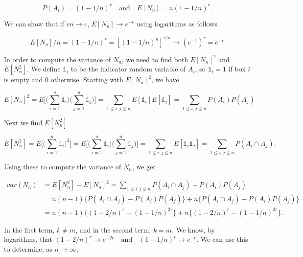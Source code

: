 \documentclass[11pt]{article}
\begin{document}
\begin{equation}
P(A_{i}) = (1 - 1/n)^{r} \quad \text{and} \quad E[N_{n}] = n(1 - 1/n)^{r}.
\end{equation}

\noindent We can show that if $rn \to c$, $E[N_{n}] \to e^{-c}$ using logarithms as follows

\begin{equation}
 E[N_{n}]/n = (1 - 1/n)^{r} = [(1 - 1/n)^{n}]^{r/n} \to (e^{-1})^{c} = e^{-c}
\end{equation}

In order to compute the variance of $N_{n}$, we need to find both $E[N_{n}]^{2}$ and $E[N_{n}^{2}]$. We define $\mathds{1}_{i}$ to be the indicator random variable of $A_{i}$, so $\mathds{1}_{i} = 1$ if box $i$ is empty and 0 otherwise. Starting with $E[N_{n}]^{2}$, we have

\begin{equation}
 E[N_{n}]^{2} = E\bigg[\bigg(\sum_{i=1}^{n}\mathds{1}_{i}\bigg)\bigg(\sum_{j=1}^{n}\mathds{1}_{j}\bigg)\bigg] = \sum_{1 \le i,j \le n}E[\mathds{1}_{i}]E[\mathds{1}_{j}] = \sum_{1 \le i,j \le n} P(A_{i})P(A_{j})
\end{equation}

\noindent Next we find $E[N_{n}^{2}]$

\begin{equation}
E[N_{n}^{2}] = E\bigg[\bigg(\sum_{i=1}^{n}\mathds{1}_{i}\bigg)^{2}\bigg] =  E\bigg[\bigg(\sum_{i=1}^{n}\mathds{1}_{i}\bigg)\bigg(\sum_{j=1}^{n}\mathds{1}_{j}\bigg)\bigg] = \sum_{1 \le i,j \le n}E[\mathds{1}_{i} \mathds{1}_{j}]= \sum_{1 \le i,j \le n}P(A_{i} \cap A_{j}).
\end{equation}


\noindent Using these to compute the variance of $N_{n}$, we get

\begin{align*}
var(N_{n})  &= E[N_{n}^{2}] - E[N_{n}]^{2} = \sum_{1 \le i,j \le n}P(A_{i} \cap A_{j}) - P(A_{i})P(A_{j}) \\
&= n(n - 1)\{P(A_{i} \cap A_{j}) - P(A_{i})P(A_{j})\} + n\{P(A_{i} \cap A_{j}) - P(A_{i})P(A_{j})\} \\
&= n(n - 1)\{(1 - 2/n)^{r} - (1 - 1/n)^{2r}\} + n\{(1 - 2/n)^{r} - (1 - 1/n)^{2r}\}.
\end{align*}

\noindent In the first term, $k \ne m$, and in the second term, $k = m$. We know, by logarithms, that $(1 - 2/n)^{r} \to e^{-2c} \quad \text{and} \quad (1 - 1/n)^{r} \to e^{-c}$. We can use this to determine, as $n \to \infty$,
\end{document}
